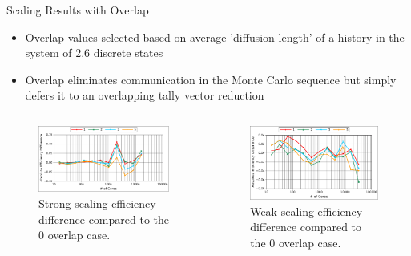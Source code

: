 \documentclass{beamer}
\begin{document}
\begin{frame}{Scaling Results with Overlap}

  \begin{itemize}
  \item Overlap values selected based on average 'diffusion length' of
    a history in the system of 2.6 discrete states
    \bigskip
  \item Overlap eliminates communication in the Monte Carlo sequence
    but simply defers it to an overlapping tally vector reduction
  \end{itemize}

  \begin{columns}
    \begin{column}{0.5\textwidth}

      \begin{figure}[htpb!]
        \begin{center}
          \includegraphics[width=2.4in]{titan_strong_overlap_diff.pdf}
        \end{center}
        \caption{Strong scaling efficiency difference compared to the
          0 overlap case.}
      \end{figure}

    \end{column}

    \begin{column}{0.5\textwidth}

      \begin{figure}[htpb!]
        \begin{center}
          \includegraphics[width=2.4in]{titan_weak_overlap_diff.pdf}
        \end{center}
        \caption{Weak scaling efficiency difference compared to the 0
          overlap case.}
      \end{figure}

    \end{column}
  \end{columns}

\end{frame}
\end{document}
